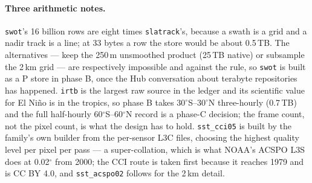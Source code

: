 \documentclass[10pt]{article}
\newcommand{\code}[1]{\texttt{#1}}
\begin{document}
\begin{table}[p]
\caption{Estimated size of every store in the layout of \S4, and the phase it is proposed for. Phase A totals $\approx 0.6$\,TB with \code{pace4k}; phase B $\approx 3.5$\,TB more; phase C is where the Hub's ``contact us for terabytes'' threshold is certainly crossed.}
\label{tab:sizes}
\end{table}

\paragraph{Three arithmetic notes.} \code{swot}'s 16 billion rows are eight
times \code{slatrack}'s, because a swath is a grid and a nadir track is a
line; at 33 bytes a row the store would be about 0.5\,TB. The alternatives ---
keep the 250\,m unsmoothed product (25\,TB native) or subsample the 2\,km
grid --- are respectively impossible and against the rule, so \code{swot} is
built as a P store in phase B, once the Hub conversation about terabyte
repositories has happened. \code{irtb} is the largest raw source in the ledger
and its scientific value for El Ni\~no is in the tropics, so phase B takes
30$^\circ$S--30$^\circ$N three-hourly (0.7\,TB) and the full half-hourly
60$^\circ$S--60$^\circ$N record is a phase-C decision; the frame count, not
the pixel count, is what the design has to hold. \code{sst\_cci05} is built
by the family's own builder from the per-sensor L3C files, choosing the
highest quality level per pixel per pass --- a super-collation, which is what
NOAA's ACSPO L3S does at 0.02$^\circ$ from 2000; the CCI route is taken first
because it reaches 1979 and is CC BY 4.0, and \code{sst\_acspo02} follows for
the 2\,km detail.
\end{document}
